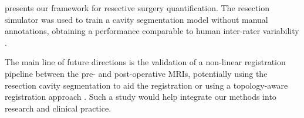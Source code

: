  presents our framework for resective surgery quantification.
The resection simulator was used to train a cavity segmentation model without manual annotations, obtaining a performance comparable to human inter-rater variability \cite{perez-garcia_simulation_2020}.



The main line of future directions is the validation of a non-linear registration pipeline between the pre- and post-operative \acp{MRI}, potentially using the resection cavity segmentation to aid the registration \cite{brett_spatial_2001,chen_deformable_2015} or using a topology-aware registration approach \cite{nielsen_topaware_2019}.
Such a study would help integrate our methods into research and clinical practice.


